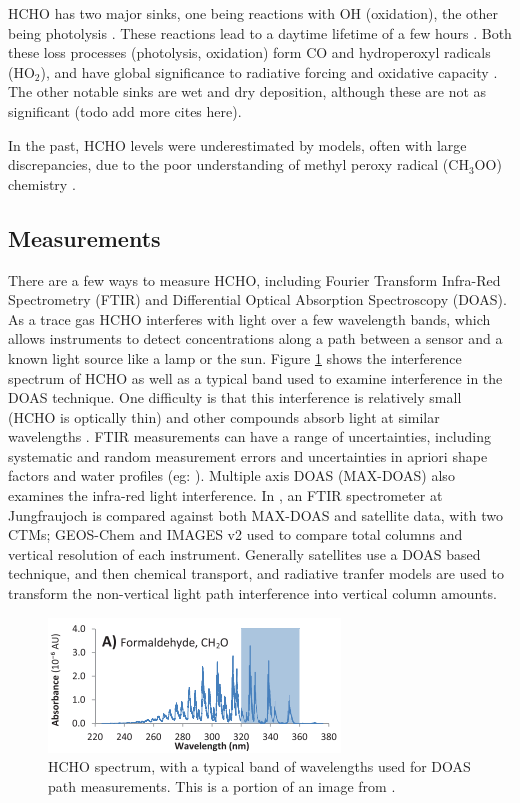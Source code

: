     HCHO has two major sinks, one being reactions with OH (oxidation), the other being photolysis \citep{Crutzen1999, Wagner2002, Levy1972}.
    These reactions lead to a daytime lifetime of a few hours \citep{Atkinson2000, Millet2006}.
    Both these loss processes (photolysis, oxidation) form CO and hydroperoxyl radicals (HO$_2$), and have global significance to radiative forcing and oxidative capacity \citep{Franco2015}.
    The other notable sinks are wet and dry deposition, although these are not as significant \citep{Atkinson2000} (todo add more cites here).
    
    In the past, HCHO levels were underestimated by models, often with large discrepancies, due to the poor understanding of methyl peroxy radical (CH$_3$OO) chemistry \citep{Wagner2002}.
    
    
  \subsection{Measurements}
    There are a few ways to measure HCHO, including Fourier Transform Infra-Red Spectrometry (FTIR) and Differential Optical Absorption Spectroscopy (DOAS).
    As a trace gas HCHO interferes with light over a few wavelength bands, which allows instruments to detect concentrations along a path between a sensor and a known light source like a lamp or the sun.
    Figure \ref{ch_LitRev:fig:HCHOSpectrum} shows the interference spectrum of HCHO as well as a typical band used to examine interference in the DOAS technique.
    One difficulty is that this interference is relatively small (HCHO is optically thin) and other compounds absorb light at similar wavelengths \citep{Davenport2015}.
    FTIR measurements can have a range of uncertainties, including systematic and random measurement errors and uncertainties in apriori shape factors and water profiles (eg: \citet{Franco2015}).
    Multiple axis DOAS (MAX-DOAS) also examines the infra-red light interference.
    In \citet{Franco2015}, an FTIR spectrometer at Jungfraujoch is compared against both MAX-DOAS and satellite data, with two CTMs; GEOS-Chem and IMAGES v2 used to compare total columns and vertical resolution of each instrument.
    Generally satellites use a DOAS based technique, and then chemical transport, and radiative tranfer models are used to transform the non-vertical light path interference into vertical column amounts.
    
    \begin{figure}
      \includegraphics{Figures/HCHO/HCHOAbsorbanceDavenport.png}
      \caption{ HCHO spectrum, with a typical band of wavelengths used for DOAS path measurements.
	This is a portion of an image from \citet{Davenport2015}.}
      \label{ch_LitRev:fig:HCHOSpectrum}
    \end{figure}
    
